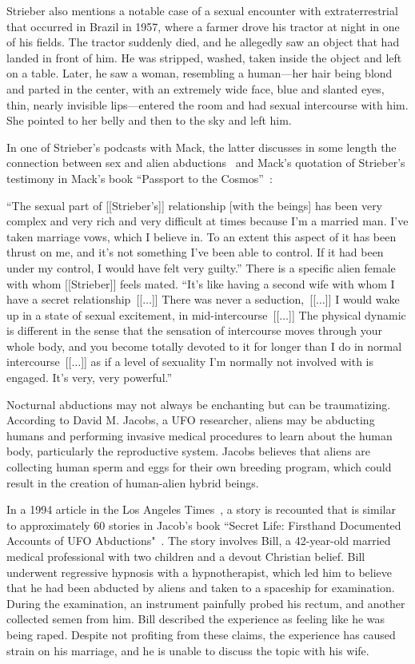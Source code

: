 Strieber also mentions
a notable case of a sexual encounter with extraterrestrial that occurred in Brazil in 1957,
where a farmer drove his tractor at night in one of his fields. The tractor suddenly died, and he allegedly
saw an object that had landed in front of him. He was stripped, washed, taken inside the object and left on a table.
Later, he saw a woman, resembling a human---her hair being blond and parted in the center, with an extremely wide face,
blue and slanted eyes, thin, nearly invisible   lips---entered the room and had sexual intercourse with him.
She pointed to her belly and then to the sky and left him.

In one of Strieber's podcasts with Mack, the latter discusses in some length the connection between sex
and alien abductions~\cite[time=26m30s]{Strieber2023Jan} and Mack's quotation of Strieber's testimony
in Mack's book ``Passport to the {C}osmos''~\cite{Mack1999PC}:
\begin{svgraybox}
``The sexual part of [[Strieber's]] relationship [with the beings] has been very complex and very rich and very difficult at times
because I'm a married man.
I've taken marriage vows, which I believe in.
To an extent this aspect of it has been thrust on me, and it's not something I've been able to control.
If it had been under my control, I would have felt very guilty.''
There is a specific alien female with whom [[Strieber]] feels mated.
``It's like having a second wife with whom I have a secret relationship~[[$\ldots$]]
There was never a seduction,~[[$\ldots$]]  I would wake up in a state of sexual excitement, in mid-intercourse~[[$\ldots$]]
The physical dynamic is different in the sense that the sensation of intercourse moves through your whole body,
and you become totally devoted to it for longer than I do in normal intercourse~[[$\ldots$]]
as if a level of sexuality I'm normally not involved with is engaged. It's very, very powerful.''
\end{svgraybox}


Nocturnal abductions may not always be enchanting but can be traumatizing. According to David M. Jacobs, a UFO researcher, aliens may be abducting humans and performing invasive medical procedures to learn about the human body, particularly the reproductive system. Jacobs believes that aliens are collecting human sperm and eggs for their own breeding program, which could result in the creation of human-alien hybrid beings.

In a 1994 article in the Los Angeles Times~\cite{Hulse2019Mar}, a story is recounted that is similar to approximately 60 stories in Jacob's book ``Secret Life: Firsthand Documented Accounts of UFO Abductions"~\cite{Jacobs1993Apr}. The story involves Bill, a 42-year-old married medical professional with two children and a devout Christian belief. Bill underwent regressive hypnosis with a hypnotherapist, which led him to believe that he had been abducted by aliens and taken to a spaceship for examination. During the examination, an instrument painfully probed his rectum, and another collected semen from him. Bill described the experience as feeling like he was being raped. Despite not profiting from these claims, the experience has caused strain on his marriage, and he is unable to discuss the topic with his wife.

